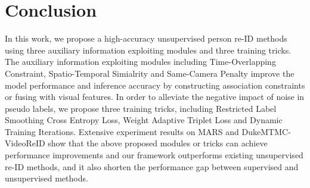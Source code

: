 \documentclass[10pt,twocolumn,letterpaper]{article}
\begin{document}
\section{Conclusion}
In this work, we propose a high-accuracy unsupervised person re-ID methods using three auxiliary information exploiting modules and three training tricks. The auxiliary information exploiting modules including Time-Overlapping Constraint, Spatio-Temporal Simialrity and Same-Camera Penalty improve the model performance and inference accuracy by constructing association constraints or fusing with visual features. In order to alleviate the negative impact of noise in pseudo labels, we propose three training tricks, including Restricted Label Smoothing Cross Entropy Loss, Weight Adaptive Triplet Loss and Dynamic Training Iterations. Extensive experiment results on MARS and DukeMTMC-VideoReID show that the above proposed modules or tricks can achieve performance improvements and our framework outperforms existing unsupervised re-ID methods, and it also shorten the performance gap between supervised and unsupervised methods.


{\small


}
\end{document}

